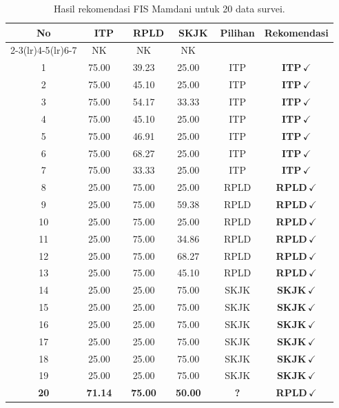 \documentclass[conference]{IEEEtran}
\begin{document}
\begin{table}[t!]
\centering\caption{Hasil rekomendasi FIS Mamdani untuk 20 data survei.}
\label{tab:hasil}
\small
\begin{tabular}{@{}c cc cc cc c c@{}}
\toprule
\multirow{2}{*}{No} & \multicolumn{2}{c}{ITP} & \multicolumn{2}{c}{RPLD}
  & \multicolumn{2}{c}{SKJK} & \multirow{2}{*}{Pilihan} & \multirow{2}{*}{Rekomendasi} \\
\cmidrule(lr){2-3}\cmidrule(lr){4-5}\cmidrule(lr){6-7}
  & NK & & NK & & NK & & & \\
\midrule
1  & 75.00 & & 39.23 & & 25.00 & & ITP  & \textbf{ITP}\,$\checkmark$ \\
2  & 75.00 & & 45.10 & & 25.00 & & ITP  & \textbf{ITP}\,$\checkmark$ \\
3  & 75.00 & & 54.17 & & 33.33 & & ITP  & \textbf{ITP}\,$\checkmark$ \\
4  & 75.00 & & 45.10 & & 25.00 & & ITP  & \textbf{ITP}\,$\checkmark$ \\
5  & 75.00 & & 46.91 & & 25.00 & & ITP  & \textbf{ITP}\,$\checkmark$ \\
6  & 75.00 & & 68.27 & & 25.00 & & ITP  & \textbf{ITP}\,$\checkmark$ \\
7  & 75.00 & & 33.33 & & 25.00 & & ITP  & \textbf{ITP}\,$\checkmark$ \\
\midrule
8  & 25.00 & & 75.00 & & 25.00 & & RPLD & \textbf{RPLD}\,$\checkmark$ \\
9  & 25.00 & & 75.00 & & 59.38 & & RPLD & \textbf{RPLD}\,$\checkmark$ \\
10 & 25.00 & & 75.00 & & 25.00 & & RPLD & \textbf{RPLD}\,$\checkmark$ \\
11 & 25.00 & & 75.00 & & 34.86 & & RPLD & \textbf{RPLD}\,$\checkmark$ \\
12 & 25.00 & & 75.00 & & 68.27 & & RPLD & \textbf{RPLD}\,$\checkmark$ \\
13 & 25.00 & & 75.00 & & 45.10 & & RPLD & \textbf{RPLD}\,$\checkmark$ \\
\midrule
14 & 25.00 & & 25.00 & & 75.00 & & SKJK & \textbf{SKJK}\,$\checkmark$ \\
15 & 25.00 & & 25.00 & & 75.00 & & SKJK & \textbf{SKJK}\,$\checkmark$ \\
16 & 25.00 & & 25.00 & & 75.00 & & SKJK & \textbf{SKJK}\,$\checkmark$ \\
17 & 25.00 & & 25.00 & & 75.00 & & SKJK & \textbf{SKJK}\,$\checkmark$ \\
18 & 25.00 & & 25.00 & & 75.00 & & SKJK & \textbf{SKJK}\,$\checkmark$ \\
19 & 25.00 & & 25.00 & & 75.00 & & SKJK & \textbf{SKJK}\,$\checkmark$ \\
\midrule
\textbf{20} & \textbf{71.14} & & \textbf{75.00} & & \textbf{50.00} &
  & \textbf{?} & \textbf{RPLD}\,$\checkmark$ \\
\bottomrule
\end{tabular}
\end{table}
\end{document}
